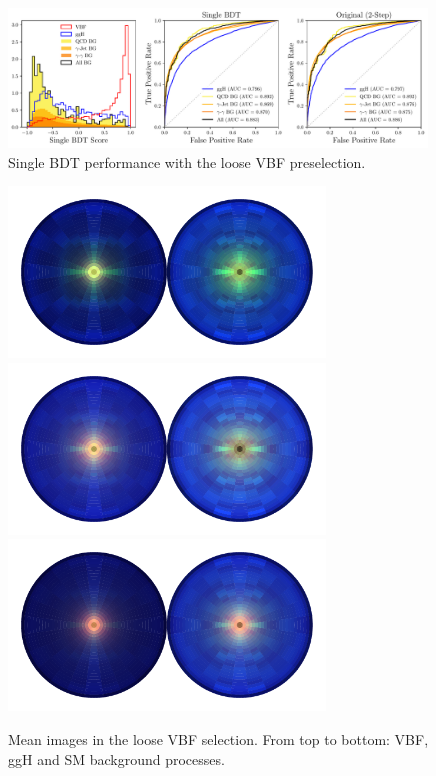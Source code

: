 %
\begin{figure}[h!]
    \begin{center}
    \includegraphics[width=0.99\textwidth]{figures/appendix_VBFLPS/dijet_BDT_LPS_unw.pdf}
    \end{center}
    \caption{Single BDT performance with the loose VBF preselection.}
    \label{fig:vbf_lps_appendix:single_BDT}
\end{figure}
%
\begin{figure}[h!]
    \begin{center}
    \includegraphics[width=0.75\textwidth]{figures/appendix_VBFLPS/mean_vbf_LPS_uw.pdf}
    \includegraphics[width=0.75\textwidth]{figures/appendix_VBFLPS/mean_ggh_LPS_uw.pdf}
    \includegraphics[width=0.75\textwidth]{figures/appendix_VBFLPS/mean_bkg_LPS_uw.pdf}
    \end{center}
    \caption{Mean images in the loose VBF selection. From top to bottom: VBF, ggH and SM background processes.}
    \label{fig:vbf_lps_appendix:mean_jet_image}
\end{figure}
